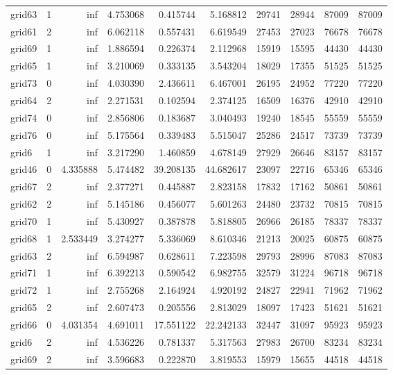 \begin{longtable}{|l|r|r|r|r|r|r|r|r|r|}
grid63 & 1 & inf & 4.753068 & 0.415744 & 5.168812 & 29741 & 28944 & 87009 & 87009 \\
grid61 & 2 & inf & 6.062118 & 0.557431 & 6.619549 & 27453 & 27023 & 76678 & 76678 \\
grid69 & 1 & inf & 1.886594 & 0.226374 & 2.112968 & 15919 & 15595 & 44430 & 44430 \\
grid65 & 1 & inf & 3.210069 & 0.333135 & 3.543204 & 18029 & 17355 & 51525 & 51525 \\
grid73 & 0 & inf & 4.030390 & 2.436611 & 6.467001 & 26195 & 24952 & 77220 & 77220 \\
grid64 & 2 & inf & 2.271531 & 0.102594 & 2.374125 & 16509 & 16376 & 42910 & 42910 \\
grid74 & 0 & inf & 2.856806 & 0.183687 & 3.040493 & 19240 & 18545 & 55559 & 55559 \\
grid76 & 0 & inf & 5.175564 & 0.339483 & 5.515047 & 25286 & 24517 & 73739 & 73739 \\
grid6 & 1 & inf & 3.217290 & 1.460859 & 4.678149 & 27929 & 26646 & 83157 & 83157 \\
grid46 & 0 & 4.335888 & 5.474482 & 39.208135 & 44.682617 & 23097 & 22716 & 65346 & 65346 \\
grid67 & 2 & inf & 2.377271 & 0.445887 & 2.823158 & 17832 & 17162 & 50861 & 50861 \\
grid62 & 2 & inf & 5.145186 & 0.456077 & 5.601263 & 24480 & 23732 & 70815 & 70815 \\
grid70 & 1 & inf & 5.430927 & 0.387878 & 5.818805 & 26966 & 26185 & 78337 & 78337 \\
grid68 & 1 & 2.533449 & 3.274277 & 5.336069 & 8.610346 & 21213 & 20025 & 60875 & 60875 \\
grid63 & 2 & inf & 6.594987 & 0.628611 & 7.223598 & 29793 & 28996 & 87083 & 87083 \\
grid71 & 1 & inf & 6.392213 & 0.590542 & 6.982755 & 32579 & 31224 & 96718 & 96718 \\
grid72 & 1 & inf & 2.755268 & 2.164924 & 4.920192 & 24827 & 22941 & 71962 & 71962 \\
grid65 & 2 & inf & 2.607473 & 0.205556 & 2.813029 & 18097 & 17423 & 51621 & 51621 \\
grid66 & 0 & 4.031354 & 4.691011 & 17.551122 & 22.242133 & 32447 & 31097 & 95923 & 95923 \\
grid6 & 2 & inf & 4.536226 & 0.781337 & 5.317563 & 27983 & 26700 & 83234 & 83234 \\
grid69 & 2 & inf & 3.596683 & 0.222870 & 3.819553 & 15979 & 15655 & 44518 & 44518 \\

\end{longtable}

